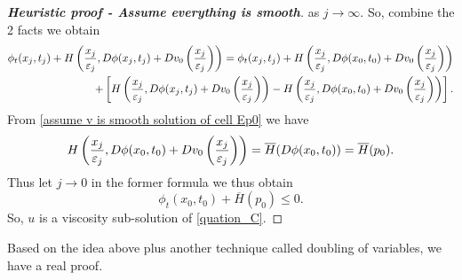 \documentclass[12pt, oneside]{amsart}  	%
\begin{document}
\begin{proof}[\textbf{Heuristic proof - Assume everything is smooth}]
as $j\longrightarrow\infty$. So, combine the 2 facts we obtain
\begin{align*}
\phi_t(x_j, t_j) + H\left(\frac{x_j}{\varepsilon_j}, D\phi(x_j, t_j) + Dv_0\left(\frac{x_j}{\varepsilon_j}\right)\right) = \phi_t(x_j, t_j) + H\left(\frac{x_j}{\varepsilon_j}, D\phi(x_0, t_0) + Dv_0\left(\frac{x_j}{\varepsilon_j}\right)\right)\\
+ \left[H\left(\frac{x_j}{\varepsilon_j}, D\phi(x_j, t_j) + Dv_0\left(\frac{x_j}{\varepsilon_j}\right)\right)-H\left(\frac{x_j}{\varepsilon_j}, D\phi(x_0, t_0) + Dv_0\left(\frac{x_j}{\varepsilon_j}\right)\right)\right].
\end{align*}
From \eqref{assume v is smooth solution of cell Ep0} we have
\begin{equation*}
H\left(\frac{x_j}{\varepsilon_j}, D\phi(x_0, t_0) + Dv_0\left(\frac{x_j}{\varepsilon_j}\right)\right) = \overline{H}(D\phi(x_0,t_0)) = \overline{H}(p_0).
\end{equation*}
Thus let $j\longrightarrow 0$ in the former formula we thus obtain 
\begin{equation*}
\phi_t(x_0, t_0) + \overline{H}(p_0)\le 0.
\end{equation*}
So, $u$ is a viscosity sub-solution of \eqref{quation_C}.
\end{proof}



Based on the idea above plus another technique called doubling of variables, we have a real proof.
\end{document}
